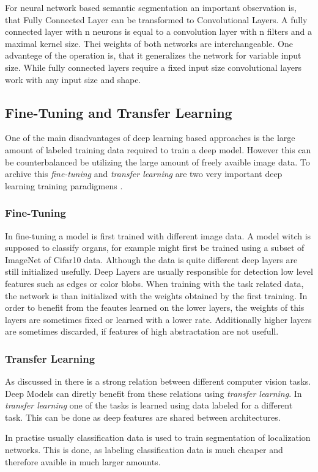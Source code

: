 For neural network based semantic segmentation an important observation is, that Fully Connected Layer can be transformed to Convolutional Layers. A fully connected layer with n neurons is equal to a convolution layer with n filters and a maximal kernel size. Thei weights of both networks are interchangeable. One advantege of the operation is, that it generalizes the network for variable input size. While fully connected layers require a fixed input size convolutional layers work with any input size and shape. 


\subsection{Fine-Tuning and Transfer Learning}


One of the main disadvantages of deep learning based approaches is the large amount of labeled training data required to train a deep model. However this can be counterbalanced be utilizing the large amount of freely avaible image data. To archive this \emph{fine-tuning} and \emph{transfer learning}  are two very important deep learning training paradigmens \cite{trans}. 
 
\subsubsection{Fine-Tuning}

In fine-tuning a model is first trained with different image data. A model witch is supposed to classify organs, for example might first be trained using a subset of ImageNet of Cifar10 data. Although the data is quite different deep layers are still initialized usefully. Deep Layers are usually responsible for detection low level features such as edges or color blobs. 
When training with the task related data, the network is than initialized with the weights obtained by the first training. In order to benefit from the feautes learned on the lower layers, the weights of this layers are sometimes fixed or learned with a lower rate. Additionally higher layers are sometimes discarded, if features of high abstractation are not usefull. 


\subsubsection{Transfer Learning}

As discussed in  there is a strong relation between different computer vision tasks. Deep Models can diretly benefit from these relations using \emph{transfer learning}.
In \emph{transfer learning} one of the tasks is learned using data labeled for a different task. This can be done as deep features are shared between architectures. 

In practise usually classification data is used to train segmentation of localization networks. This is done, as labeling classification data is much cheaper and therefore avaible in much larger amounts. 






\label{sec:fully_connected}

